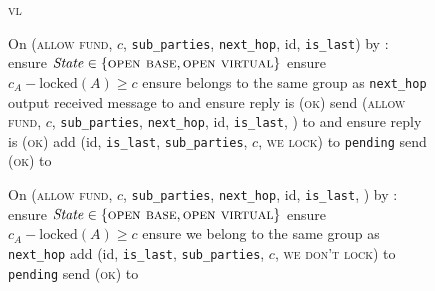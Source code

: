 \begin{figure}[H]
\begin{systembox}{\textsc{vl}}
\begin{algorithmic}[1]
      \State {}
      \State On (\textsc{allow fund}, $c$, \texttt{sub\_parties},
      \texttt{next\_hop}, id, \texttt{is\_last}) by \charlie:
      \Indent
        \State ensure $\mathit{State} \in \{\textsc{open base}, \textsc{open
        virtual}\}$
        \State ensure $c_A - \mathrm{locked}(A) \geq c$
        \State ensure \bob belongs to the same group as \texttt{next\_hop}
        \State output received message to \dave and ensure reply is
        \textsc{(ok)}
        \State send (\textsc{allow fund}, $c$, \texttt{sub\_parties},
        \texttt{next\_hop}, id, \texttt{is\_last}, \charlie) to \bob and ensure
        reply is (\textsc{ok})
        \State add (id, \texttt{is\_last}, \texttt{sub\_parties}, $c$,
        \textsc{we lock}) to \texttt{pending}
        \State send (\textsc{ok}) to \charlie
      \EndIndent
      \Statex

      \State {}
      \State On (\textsc{allow fund}, $c$, \texttt{sub\_parties},
      \texttt{next\_hop}, id, \texttt{is\_last}, \charlie) by \bob:
      \Indent
        \State ensure $\mathit{State} \in \{\textsc{open base}, \textsc{open
        virtual}\}$
        \State ensure $c_A - \mathrm{locked}(A) \geq c$
        \State ensure we belong to the same group as \texttt{next\_hop}
        \State add (id, \texttt{is\_last}, \texttt{sub\_parties}, $c$,
        \textsc{we don't lock}) to \texttt{pending}
        \State send (\textsc{ok}) to \bob
      \EndIndent
      \Statex


\end{algorithmic}
\end{systembox}
\end{figure}
